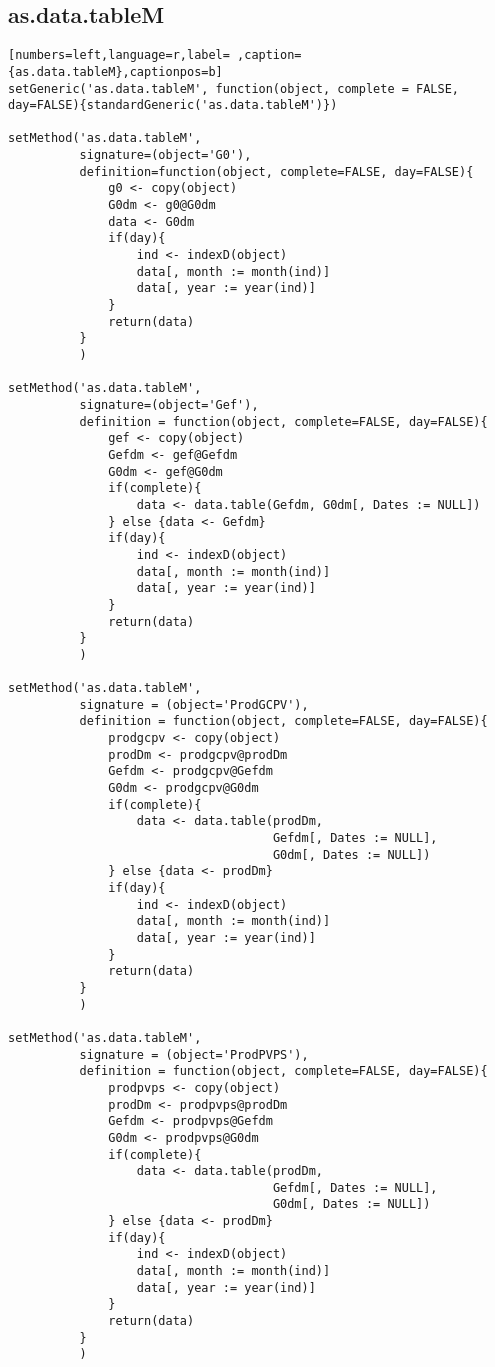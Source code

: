 \subsection{as.data.tableM}
\label{sec:org2d3b58f}
\label{subsec:as.data.tablem}
\begin{lstlisting}[numbers=left,language=r,label= ,caption={as.data.tableM},captionpos=b]
setGeneric('as.data.tableM', function(object, complete = FALSE, day=FALSE){standardGeneric('as.data.tableM')})

setMethod('as.data.tableM',
          signature=(object='G0'),
          definition=function(object, complete=FALSE, day=FALSE){
              g0 <- copy(object)
              G0dm <- g0@G0dm
              data <- G0dm
              if(day){
                  ind <- indexD(object)
                  data[, month := month(ind)]
                  data[, year := year(ind)]
              }
              return(data)
          }
          )

setMethod('as.data.tableM',
          signature=(object='Gef'),
          definition = function(object, complete=FALSE, day=FALSE){
              gef <- copy(object)
              Gefdm <- gef@Gefdm
              G0dm <- gef@G0dm
              if(complete){
                  data <- data.table(Gefdm, G0dm[, Dates := NULL])
              } else {data <- Gefdm}
              if(day){
                  ind <- indexD(object)
                  data[, month := month(ind)]
                  data[, year := year(ind)]
              }
              return(data)
          }
          )

setMethod('as.data.tableM',
          signature = (object='ProdGCPV'),
          definition = function(object, complete=FALSE, day=FALSE){
              prodgcpv <- copy(object)
              prodDm <- prodgcpv@prodDm
              Gefdm <- prodgcpv@Gefdm
              G0dm <- prodgcpv@G0dm
              if(complete){
                  data <- data.table(prodDm,
                                     Gefdm[, Dates := NULL],
                                     G0dm[, Dates := NULL])
              } else {data <- prodDm}
              if(day){
                  ind <- indexD(object)
                  data[, month := month(ind)]
                  data[, year := year(ind)]
              }
              return(data)
          }
          )

setMethod('as.data.tableM',
          signature = (object='ProdPVPS'),
          definition = function(object, complete=FALSE, day=FALSE){
              prodpvps <- copy(object)
              prodDm <- prodpvps@prodDm
              Gefdm <- prodpvps@Gefdm
              G0dm <- prodpvps@G0dm
              if(complete){
                  data <- data.table(prodDm,
                                     Gefdm[, Dates := NULL],
                                     G0dm[, Dates := NULL])
              } else {data <- prodDm}
              if(day){
                  ind <- indexD(object)
                  data[, month := month(ind)]
                  data[, year := year(ind)]
              }
              return(data)
          }
          )
\end{lstlisting}
